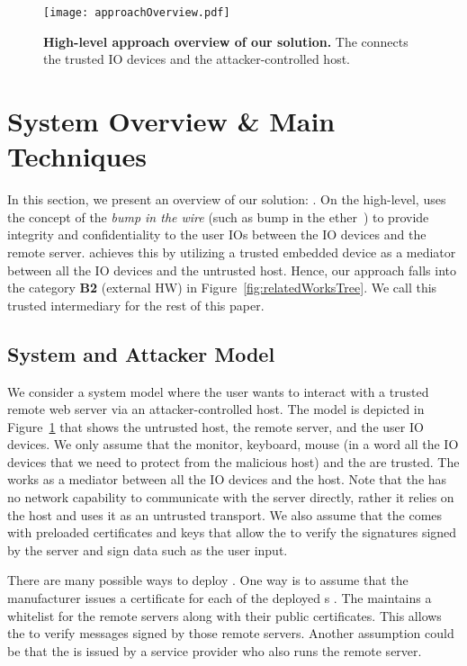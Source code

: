 \begin{figure}[t]
\centering
\texttt{[image: approachOverview.pdf]}
\caption{\textbf{High-level approach overview of our solution.}  The \device connects the trusted IO devices and the attacker-controlled host. 
}
\spacesave
\label{fig:approachOverview}
\centering
\end{figure}

\section{System Overview \& Main Techniques}
\label{sec:approach}

In this section, we present an overview of our solution: \name. On the high-level, \name uses the concept of the \emph{bump in the wire} (such as bump in the ether~\cite{McCPerRei2006}) to provide integrity and confidentiality to the user IO{}s between the IO devices and the remote server. \name achieves this by utilizing a trusted embedded device as a mediator between all the IO devices and the untrusted host. Hence, our approach falls into the category \textbf{B2} (external HW) in Figure~\ref{fig:relatedWorksTree}. 
We call this trusted intermediary \device for the rest of this paper.   


\subsection{System and Attacker Model}
\label{sec:approach:systemAttackerModel}

We consider a system model where the user wants to interact with a trusted remote web server via an attacker-controlled host. The model is depicted in Figure~\ref{fig:approachOverview} that shows the untrusted host, the remote server, and the user IO devices. We only assume that the monitor, keyboard, mouse (in a word all the IO devices that we need to protect from the malicious host) and the \device are trusted. The \device works as a mediator between all the IO devices and the host. Note that the \device has no network capability to communicate with the server directly, rather it relies on the host and uses it as an untrusted transport. We also assume that the \device comes with preloaded certificates and keys that allow the \device to verify the signatures signed by the server and sign data such as the user input.

There are many possible ways to deploy \name. One way is to assume that the \device manufacturer issues a certificate for each of the deployed \device{}s . The \device maintains a whitelist for the remote servers along with their public certificates. This allows the \device to verify messages signed by those remote servers. Another assumption could be that the \device is issued by a service provider who also runs the remote server. 

